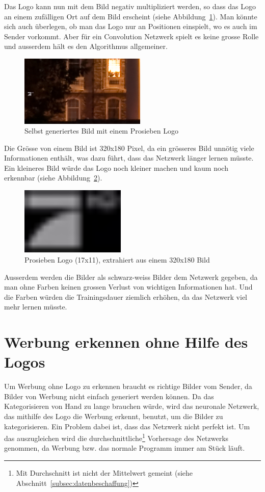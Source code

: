 \documentclass[12pt,a4paper]{report}
\begin{document}
Das Logo kann nun mit dem Bild negativ multipliziert werden, so dass das Logo an einem zufälligen Ort auf dem Bild erscheint (siehe Abbildung~\ref{fig:logo8}).
Man könnte sich auch überlegen, ob man das Logo nur an Positionen einspielt, wo es auch im Sender vorkommt.
Aber für ein Convolution Netzwerk spielt es keine grosse Rolle und ausserdem hält es den Algorithmus allgemeiner.
\begin{figure}[h]%
    \centering
    \includegraphics[width=6cm]{assets/images/logo_on_random_image.png}%
    \caption{Selbst generiertes Bild mit einem Prosieben Logo}%
    \label{fig:logo8}%
\end{figure}
Die Grösse von einem Bild ist 320x180 Pixel, da ein grösseres Bild unnötig viele Informationen enthält,
was dazu führt, dass das Netzwerk länger lernen müsste.
Ein kleineres Bild würde das Logo noch kleiner machen und kaum noch erkennbar (siehe Abbildung~\ref{fig:logo6}).
\begin{figure}[h]%
    \centering
    \includegraphics[width=5cm]{assets/images/logo17x11.png}%
    \caption{Prosieben Logo (17x11), extrahiert aus einem 320x180 Bild}%
    \label{fig:logo6}%
\end{figure}
Ausserdem werden die Bilder als schwarz-weiss Bilder dem Netzwerk gegeben,
da man ohne Farben keinen grossen Verlust von wichtigen Informationen hat.
Und die Farben würden die Trainingsdauer ziemlich erhöhen,
da das Netzwerk viel mehr lernen müsste.
\section{Werbung erkennen ohne Hilfe des Logos}
Um Werbung ohne Logo zu erkennen braucht es richtige Bilder vom Sender, da Bilder von Werbung nicht einfach generiert werden können.
Da das Kategorisieren von Hand zu lange brauchen würde, wird das neuronale Netzwerk, das mithilfe des Logo die Werbung erkennt, benutzt,
um die Bilder zu kategorisieren.
Ein Problem dabei ist, dass das Netzwerk nicht perfekt ist.
Um das auszugleichen wird die durchschnittliche\footnote{Mit Durchschnitt ist nicht der Mittelwert gemeint (siehe Abschnitt~\ref{subsec:datenbeschaffung})} Vorhersage des Netzwerks genommen,
da Werbung bzw. das normale Programm immer am Stück läuft.
\end{document}
